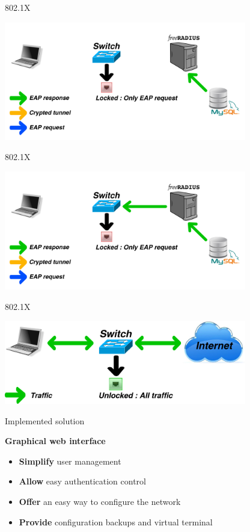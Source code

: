 \documentclass[12pt]{beamer}
\begin{document}
\begin{frame}{802.1X}
\vfill
\begin{center}
    \includegraphics[width=300pt]{img/dot1x_5.pdf}
\end{center}
\vfill
\end{frame}

\begin{frame}{802.1X}
\vfill
\begin{center}
    \includegraphics[width=300pt]{img/dot1x_6.pdf}
\end{center}
\vfill
\end{frame}

\begin{frame}{802.1X}
\vfill
\begin{center}
    \includegraphics[width=300pt]{img/dot1x_7.pdf}
\end{center}
\vfill
\end{frame}

\begin{frame}{Implemented solution}
    \begin{center}
    \textbf{Graphical web interface}
    \end{center}

    \pause
    \begin{itemize}[<+->]\vfill
	\item \textbf{Simplify} user management\vfill
	\item \textbf{Allow} easy authentication control\vfill
	\item \textbf{Offer} an easy way to configure the network\vfill
    	\item \textbf{Provide} configuration backups and virtual terminal\vfill
    \end{itemize}
    \vfill
\end{frame}
	
\end{document}
